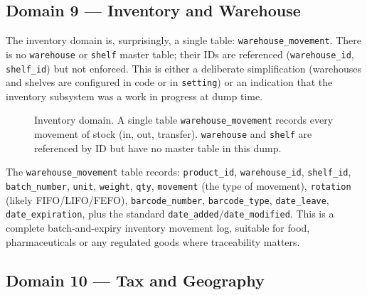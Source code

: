 \documentclass[11pt,a4paper]{article}
\begin{document}
\subsection{Domain 9 --- Inventory and Warehouse}\label{sec:inventory}

The inventory domain is, surprisingly, a single table:
\texttt{warehouse\_movement}. There is no \texttt{warehouse}
or \texttt{shelf} master table; their IDs are referenced
(\texttt{warehouse\_id}, \texttt{shelf\_id}) but not
enforced. This is either a deliberate simplification
(warehouses and shelves are configured in code or in
\texttt{setting}) or an indication that the inventory
subsystem was a work in progress at dump time.

\begin{figure}[htbp]
\centering
{}
\caption{Inventory domain. A single table
\texttt{warehouse\_movement} records every movement of stock
(in, out, transfer). \texttt{warehouse} and \texttt{shelf}
are referenced by ID but have no master table in this dump.}
\label{fig:inventory}
\end{figure}

The \texttt{warehouse\_movement} table records:
\texttt{product\_id}, \texttt{warehouse\_id},
\texttt{shelf\_id}, \texttt{batch\_number}, \texttt{unit},
\texttt{weight}, \texttt{qty}, \texttt{movement} (the type
of movement), \texttt{rotation} (likely FIFO/LIFO/FEFO),
\texttt{barcode\_number}, \texttt{barcode\_type},
\texttt{date\_leave}, \texttt{date\_expiration}, plus the
standard \texttt{date\_added}/\texttt{date\_modified}.
This is a complete batch-and-expiry inventory movement log,
suitable for food, pharmaceuticals or any regulated goods
where traceability matters.

\subsection{Domain 10 --- Tax and Geography}\label{sec:tax}
\end{document}
